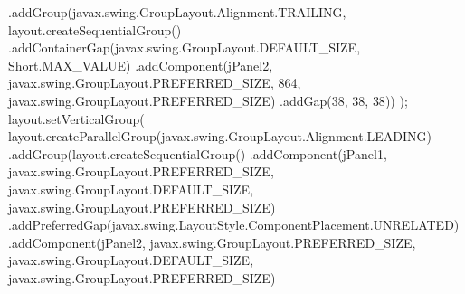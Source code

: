 \documentclass[
  10pt,
]{article}
\newenvironment{Shaded}{}{}
\newcommand{\BuiltInTok}[1]{\textcolor[rgb]{0.00,0.50,0.00}{#1}}
\newcommand{\DecValTok}[1]{\textcolor[rgb]{0.25,0.63,0.44}{#1}}
\newcommand{\FunctionTok}[1]{\textcolor[rgb]{0.02,0.16,0.49}{#1}}
\newcommand{\NormalTok}[1]{#1}
\newcommand{\OperatorTok}[1]{\textcolor[rgb]{0.40,0.40,0.40}{#1}}
\begin{document}
\begin{Shaded}
\begin{Highlighting}[numbers=left,,]
            \OperatorTok{.}\FunctionTok{addGroup}\OperatorTok{(}\NormalTok{javax}\OperatorTok{.}\FunctionTok{swing}\OperatorTok{.}\FunctionTok{GroupLayout}\OperatorTok{.}\FunctionTok{Alignment}\OperatorTok{.}\FunctionTok{TRAILING}\OperatorTok{,}\NormalTok{ layout}\OperatorTok{.}\FunctionTok{createSequentialGroup}\OperatorTok{()}
                \OperatorTok{.}\FunctionTok{addContainerGap}\OperatorTok{(}\NormalTok{javax}\OperatorTok{.}\FunctionTok{swing}\OperatorTok{.}\FunctionTok{GroupLayout}\OperatorTok{.}\FunctionTok{DEFAULT\_SIZE}\OperatorTok{,} \BuiltInTok{Short}\OperatorTok{.}\FunctionTok{MAX\_VALUE}\OperatorTok{)}
                \OperatorTok{.}\FunctionTok{addComponent}\OperatorTok{(}\NormalTok{jPanel2}\OperatorTok{,}\NormalTok{ javax}\OperatorTok{.}\FunctionTok{swing}\OperatorTok{.}\FunctionTok{GroupLayout}\OperatorTok{.}\FunctionTok{PREFERRED\_SIZE}\OperatorTok{,} \DecValTok{864}\OperatorTok{,}\NormalTok{ javax}\OperatorTok{.}\FunctionTok{swing}\OperatorTok{.}\FunctionTok{GroupLayout}\OperatorTok{.}\FunctionTok{PREFERRED\_SIZE}\OperatorTok{)}
                \OperatorTok{.}\FunctionTok{addGap}\OperatorTok{(}\DecValTok{38}\OperatorTok{,} \DecValTok{38}\OperatorTok{,} \DecValTok{38}\OperatorTok{))}
        \OperatorTok{);}
\NormalTok{        layout}\OperatorTok{.}\FunctionTok{setVerticalGroup}\OperatorTok{(}
\NormalTok{            layout}\OperatorTok{.}\FunctionTok{createParallelGroup}\OperatorTok{(}\NormalTok{javax}\OperatorTok{.}\FunctionTok{swing}\OperatorTok{.}\FunctionTok{GroupLayout}\OperatorTok{.}\FunctionTok{Alignment}\OperatorTok{.}\FunctionTok{LEADING}\OperatorTok{)}
            \OperatorTok{.}\FunctionTok{addGroup}\OperatorTok{(}\NormalTok{layout}\OperatorTok{.}\FunctionTok{createSequentialGroup}\OperatorTok{()}
                \OperatorTok{.}\FunctionTok{addComponent}\OperatorTok{(}\NormalTok{jPanel1}\OperatorTok{,}\NormalTok{ javax}\OperatorTok{.}\FunctionTok{swing}\OperatorTok{.}\FunctionTok{GroupLayout}\OperatorTok{.}\FunctionTok{PREFERRED\_SIZE}\OperatorTok{,}\NormalTok{ javax}\OperatorTok{.}\FunctionTok{swing}\OperatorTok{.}\FunctionTok{GroupLayout}\OperatorTok{.}\FunctionTok{DEFAULT\_SIZE}\OperatorTok{,}\NormalTok{ javax}\OperatorTok{.}\FunctionTok{swing}\OperatorTok{.}\FunctionTok{GroupLayout}\OperatorTok{.}\FunctionTok{PREFERRED\_SIZE}\OperatorTok{)}
                \OperatorTok{.}\FunctionTok{addPreferredGap}\OperatorTok{(}\NormalTok{javax}\OperatorTok{.}\FunctionTok{swing}\OperatorTok{.}\FunctionTok{LayoutStyle}\OperatorTok{.}\FunctionTok{ComponentPlacement}\OperatorTok{.}\FunctionTok{UNRELATED}\OperatorTok{)}
                \OperatorTok{.}\FunctionTok{addComponent}\OperatorTok{(}\NormalTok{jPanel2}\OperatorTok{,}\NormalTok{ javax}\OperatorTok{.}\FunctionTok{swing}\OperatorTok{.}\FunctionTok{GroupLayout}\OperatorTok{.}\FunctionTok{PREFERRED\_SIZE}\OperatorTok{,}\NormalTok{ javax}\OperatorTok{.}\FunctionTok{swing}\OperatorTok{.}\FunctionTok{GroupLayout}\OperatorTok{.}\FunctionTok{DEFAULT\_SIZE}\OperatorTok{,}\NormalTok{ javax}\OperatorTok{.}\FunctionTok{swing}\OperatorTok{.}\FunctionTok{GroupLayout}\OperatorTok{.}\FunctionTok{PREFERRED\_SIZE}\OperatorTok{)}

\end{Highlighting}
\end{Shaded}
\end{document}
